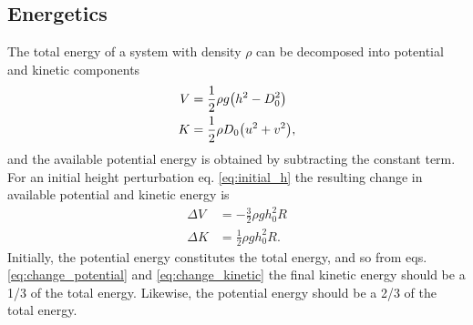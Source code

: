 \subsection{Energetics}
The total energy of a system with density $\rho$ can be decomposed into potential and kinetic components
	\begin{align}
		V &= \frac{1}{2}\rho g \qty(h^2 - D^2_0) \\
		K &= \frac{1}{2}\rho D_0 \qty(u^2 + v^2),
	\end{align}
and the available potential energy is obtained by subtracting the constant term.
For an initial height perturbation eq. \ref{eq:initial_h} the resulting change in available potential and kinetic energy is
	\begin{align}
		\Delta V &= - \frac{3}{2} \rho g h^2_0 R \label{eq:change_potential} \\
		\Delta K &= \frac{1}{2} \rho g h^2_0 R \label{eq:change_kinetic}.
	\end{align}
Initially, the potential energy constitutes the total energy, and so from eqs. \ref{eq:change_potential} and \ref{eq:change_kinetic} the final kinetic energy should be a 1/3 of the total energy. Likewise, the potential energy should be a 2/3 of the total energy.